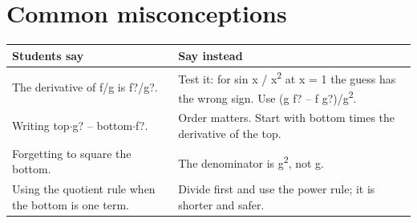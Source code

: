 \documentclass[11pt]{article}
\begin{document}
\section*{Common misconceptions}\begin{tabularx}{\textwidth}{@{}X X@{}}\toprule Students say & Say instead\\\midrule
The derivative of f/g is f?/g?. & Test it: for sin x / x\textsuperscript{2} at x = 1 the guess has the wrong sign. Use (g f? -- f g?)/g\textsuperscript{2}.\\
Writing top$\cdot$g? -- bottom$\cdot$f?. & Order matters. Start with bottom times the derivative of the top.\\
Forgetting to square the bottom. & The denominator is g\textsuperscript{2}, not g.\\
Using the quotient rule when the bottom is one term. & Divide first and use the power rule; it is shorter and safer.\\
\bottomrule\end{tabularx}
\end{document}

